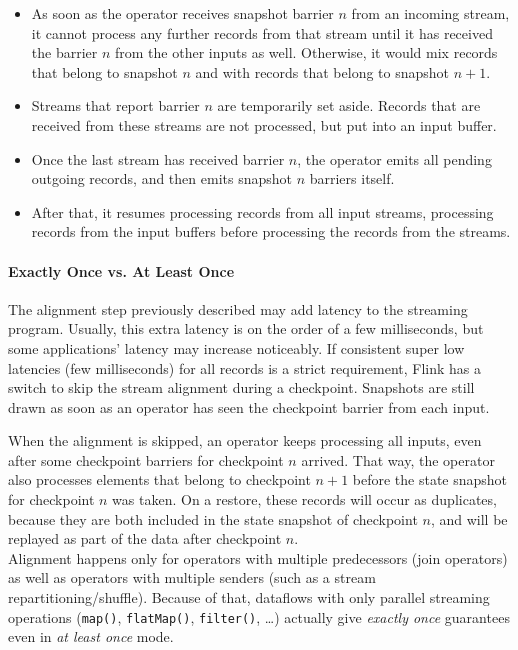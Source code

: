 \begin{itemize}
\item As soon as the operator receives snapshot barrier $n$ from an incoming stream, it cannot process any further records from that stream until it has received the barrier $n$ from the other inputs as well. Otherwise, it would mix records that belong to snapshot $n$ and with records that belong to snapshot $n+1$.
\item Streams that report barrier $n$ are temporarily set aside. Records that are received from these streams are not processed, but put into an input buffer.
\item Once the last stream has received barrier $n$, the operator emits all pending outgoing records, and then emits snapshot $n$ barriers itself.
\item After that, it resumes processing records from all input streams, processing records from the input buffers before processing the records from the streams.
\end{itemize}

\paragraph{Exactly Once vs. At Least Once}

The alignment step previously described may add latency to the streaming program. Usually, this extra latency is on the order of a few milliseconds, but some applications' latency may increase noticeably. If consistent super low latencies (few milliseconds) for all records is a strict requirement, Flink has a switch to skip the stream alignment during a checkpoint. Snapshots are still drawn as soon as an operator has seen the checkpoint barrier from each input.

When the alignment is skipped, an operator keeps processing all inputs, even after some checkpoint barriers for checkpoint $n$ arrived. That way, the operator also processes elements that belong to checkpoint $n+1$ before the state snapshot for checkpoint $n$ was taken. On a restore, these records will occur as duplicates, because they are both included in the state snapshot of checkpoint $n$, and will be replayed as part of the data after checkpoint $n$.
\\
Alignment happens only for operators with multiple predecessors (join operators) as well as operators with multiple senders (such as a stream repartitioning/shuffle). Because of that, dataflows with only parallel streaming operations (\texttt{map()}, \texttt{flatMap()}, \texttt{filter()}, …) actually give \textit{exactly once} guarantees even in \textit{at least once} mode.

